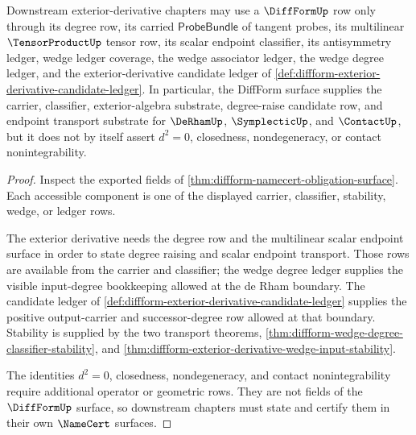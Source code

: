 \begin{theorem}
\label{thm:diffform-exterior-derivative-downstream-scope}
Downstream exterior-derivative chapters may use a $\DiffFormUp$ row only
through its degree row, its carried $\mathsf{ProbeBundle}$ of tangent probes,
its multilinear $\TensorProductUp$ tensor row, its scalar endpoint classifier,
its antisymmetry ledger, wedge ledger coverage, the wedge associator ledger,
the wedge degree ledger, and the exterior-derivative candidate ledger of
\autoref{def:diffform-exterior-derivative-candidate-ledger}. In particular, the
DiffForm surface supplies the carrier, classifier, exterior-algebra substrate,
degree-raise candidate row, and endpoint transport substrate for $\DeRhamUp$,
$\SymplecticUp$, and $\ContactUp$, but it does not by itself assert $d^2=0$,
closedness, nondegeneracy, or contact nonintegrability.
\end{theorem}
\begin{proof}
Inspect the exported fields of
\autoref{thm:diffform-namecert-obligation-surface}. Each accessible component
is one of the displayed carrier, classifier, stability, wedge, or ledger rows.

The exterior derivative needs the degree row and the multilinear scalar
endpoint surface in order to state degree raising and scalar endpoint
transport. Those rows are available from the carrier and classifier; the
wedge degree ledger supplies the visible input-degree bookkeeping allowed at
the de Rham boundary. The candidate ledger of
\autoref{def:diffform-exterior-derivative-candidate-ledger} supplies the
positive output-carrier and successor-degree row allowed at that boundary.
Stability is supplied by the two transport theorems,
\autoref{thm:diffform-wedge-degree-classifier-stability}, and
\autoref{thm:diffform-exterior-derivative-wedge-input-stability}.

The identities $d^2=0$, closedness, nondegeneracy, and contact
nonintegrability require additional operator or geometric rows. They are not
fields of the $\DiffFormUp$ surface, so downstream chapters must state and
certify them in their own $\NameCert$ surfaces.
\end{proof}

